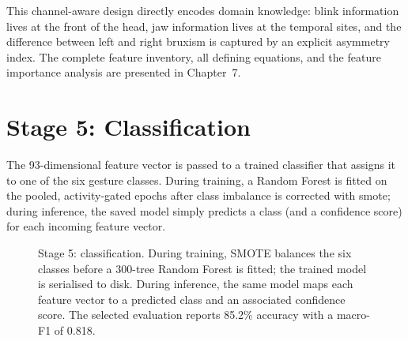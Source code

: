 This channel-aware design directly encodes domain knowledge: blink
information lives at the front of the head, jaw information lives at
the temporal sites, and the difference between left and right
bruxism is captured by an explicit asymmetry index. The complete
feature inventory, all defining equations, and the feature
importance analysis are presented in Chapter~7.

\section{Stage 5: Classification}
\label{sec:mo_classification}

The 93-dimensional feature vector is passed to a trained classifier
that assigns it to one of the six gesture classes. During training,
a Random Forest is fitted on the pooled, activity-gated epochs after
class imbalance is corrected with \acrshort{smote}; during
inference, the saved model simply predicts a class (and a confidence
score) for each incoming feature vector.

\begin{figure}[htbp]
\centering
{}
\caption{Stage 5: classification. During training, SMOTE balances
the six classes before a 300-tree Random Forest is fitted; the
trained model is serialised to disk. During inference, the same
model maps each feature vector to a predicted class and an
associated confidence score. The selected evaluation reports 85.2\%
accuracy with a macro-F1 of 0.818.}
\label{fig:mo_classification}
\end{figure}

